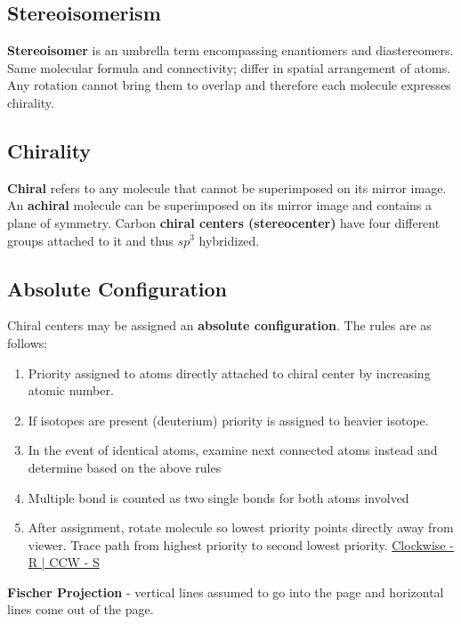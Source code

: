 \documentclass[../OChemReview.tex]{subfiles}
\begin{document}
  \subsection{Stereoisomerism}
  \textbf{Stereoisomer} is an umbrella term encompassing enantiomers and
  diastereomers.\\
  Same molecular formula and connectivity; differ in spatial arrangement of
  atoms. Any rotation cannot bring them to overlap and therefore each molecule
  expresses chirality.

  \subsection{Chirality}

  \textbf{Chiral} refers to any molecule that cannot be superimposed on its
  mirror image. An \textbf{achiral} molecule can be superimposed on its mirror
  image and contains a plane of symmetry. Carbon \textbf{chiral centers
  (stereocenter)} have four different groups attached to it and thus $ sp^{3} $
  hybridized. 

  \subsection{Absolute Configuration}

  Chiral centers may be assigned an \textbf{absolute configuration}. The rules
  are as follows:
  \begin{enumerate}
    \item Priority assigned to atoms directly attached to chiral center by
      increasing atomic number.
    \item If isotopes are present (deuterium) priority is assigned to heavier
      isotope.
    \item In the event of identical atoms, examine next connected atoms instead
      and determine based on the above rules
    \item Multiple bond is counted as two single bonds for both atoms involved
    \item After assignment, rotate molecule so lowest priority points directly
      away from viewer. Trace path from highest priority to second lowest
      priority. \underline{Clockwise - R | CCW - S}\\

  \end{enumerate}
  \textbf{Fischer Projection} - vertical lines assumed to go into the page and
  horizontal lines come out of the page.
\end{document}
